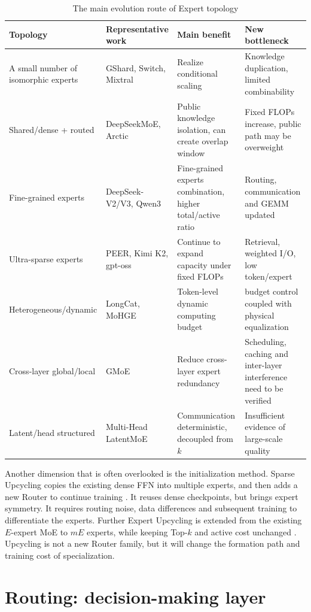 \documentclass[10pt,a4paper,fontset=none]{ctexart}
\begin{document}
\begin{table}[htbp]
\centering
\caption{The main evolution route of Expert topology}
\label{en:tab:topology}
\small
\begin{tabularx}{\textwidth}{p{}p{}Y Y}
\toprule
Topology & Representative work & Main benefit & New bottleneck \\
\midrule
A small number of isomorphic experts & GShard, Switch, Mixtral & Realize conditional scaling & Knowledge duplication, limited combinability \\
Shared/dense + routed & DeepSeekMoE, Arctic & Public knowledge isolation, can create overlap window & Fixed FLOPs increase, public path may be overweight \\
Fine-grained experts & DeepSeek-V2/V3, Qwen3 & Fine-grained experts combination, higher total/active ratio & Routing, communication and GEMM updated \\
Ultra-sparse experts & PEER, Kimi K2, gpt-oss & Continue to expand capacity under fixed FLOPs & Retrieval, weighted I/O, low token/expert \\
Heterogeneous/dynamic & LongCat, MoHGE & Token-level dynamic computing budget & budget control coupled with physical equalization \\
Cross-layer global/local & GMoE & Reduce cross-layer expert redundancy & Scheduling, caching and inter-layer interference need to be verified \\
Latent/head structured & Multi-Head LatentMoE & Communication deterministic, decoupled from $k$ & Insufficient evidence of large-scale quality \\
\bottomrule
\end{tabularx}
\end{table}

Another dimension that is often overlooked is the initialization method. Sparse Upcycling copies the existing dense FFN into multiple experts, and then adds a new Router to continue training \cite{en:komatsuzaki2022upcycling}. It reuses dense checkpoints, but brings expert symmetry. It requires routing noise, data differences and subsequent training to differentiate the experts. Further Expert Upcycling is extended from the existing $E$-expert MoE to $mE$ experts, while keeping Top-$k$ and active cost unchanged \cite{en:expertUpcycling2026}. Upcycling is not a new Router family, but it will change the formation path and training cost of specialization.

\section{Routing: decision-making layer}
\end{document}
